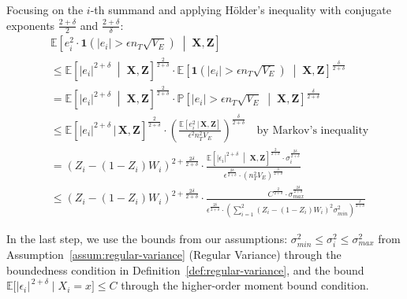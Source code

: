 \documentclass{mytemplate}
\begin{document}
Focusing on the $i$-th summand and applying Hölder's inequality with conjugate exponents $\frac{2+\delta}{2}$ and $\frac{2+\delta}{\delta}$:
\begin{align*}
    &\mathbb{E}\left[e_i^2 \cdot \mathbf{1}(|e_i| > \epsilon n_T \sqrt{V_E}) \;\middle|\; \mathbf{X}, \mathbf{Z}\right] \\
    &\leq \mathbb{E}\left[|e_i|^{2+\delta} \;\middle|\; \mathbf{X}, \mathbf{Z}\right]^{\frac{2}{2+\delta}} \cdot \mathbb{E}\left[\mathbf{1}(|e_i| > \epsilon n_T \sqrt{V_E}) \;\middle|\; \mathbf{X}, \mathbf{Z}\right]^{\frac{\delta}{2+\delta}}\\
    &= \mathbb{E}\left[|e_i|^{2+\delta} \;\middle|\; \mathbf{X}, \mathbf{Z}\right]^{\frac{2}{2+\delta}} \cdot \mathbb{P}\left[|e_i| > \epsilon n_T \sqrt{V_E} \;\middle|\; \mathbf{X}, \mathbf{Z}\right]^{\frac{\delta}{2+\delta}}\\
    &\leq \mathbb{E} \left[ |e_i|^{2+\delta} \,\big|\, \mathbf{X}, \mathbf{Z} \right]^{\frac{2}{2+\delta}}  \cdot \left(\frac{\mathbb{E} \left[ e_i^2 \,\big|\, \mathbf{X}, \mathbf{Z} \right]}{\epsilon^2 n_T^2 V_E}\right)^{\frac{\delta}{2 + \delta}}  \quad \text{by Markov's inequality} \\
    &= (Z_i - (1-Z_i) W_i)^{2 + \frac{2\delta}{2+\delta}} \cdot \frac{\mathbb{E}\left[|\epsilon_i|^{2+\delta} \;\middle|\; \mathbf{X}, \mathbf{Z}\right]^{\frac{2}{2+\delta}} \cdot \sigma_i^{\frac{2\delta}{2+\delta}}}{\epsilon^{\frac{2\delta}{2+\delta}} \cdot (n_T^2 V_E)^{\frac{\delta}{2+\delta}}} \\
    &\leq (Z_i - (1-Z_i) W_i)^{2 + \frac{2\delta}{2+\delta}} \cdot \frac{C^{\frac{2}{2+\delta}} \cdot \sigma_{max}^{\frac{2\delta}{2+\delta}}}{\epsilon^{\frac{2\delta}{2+\delta}} \cdot ( \sum_{i=1}^2 (Z_i - (1-Z_i) W_i)^2 \sigma_{min}^2 )^{\frac{\delta}{2+\delta}}}
\end{align*}

In the last step, we use the bounds from our assumptions: $\sigma_{min}^2 \leq \sigma_i^2 \leq \sigma_{max}^2$ from Assumption~\ref{assum:regular-variance} (Regular Variance) through the boundedness condition in Definition~\ref{def:regular-variance}, and the bound $\mathbb{E}\bigl[\bigl|\epsilon_i\bigr|^{\,2+\delta} \;\big|\; X_i = x \bigr] \leq C$ through the higher-order moment bound condition. 
\end{document}
